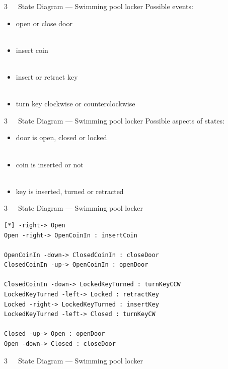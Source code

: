 \documentclass{beamer}
\begin{document}
\begin{frame}{3~~~State Diagram — Swimming pool locker}
Possible \alert{events}:
\\\mbox{}
\begin{itemize}
\item open or close door
\\\mbox{}\\
\item insert coin
\\\mbox{}\\
\item insert or retract key
\\\mbox{}\\
\item turn key clockwise or counterclockwise
\end{itemize}
\end{frame}

\begin{frame}{3~~~State Diagram — Swimming pool locker}
Possible aspects of \alert{states}:
\\\mbox{}
\begin{itemize}
\item door is open, closed or locked
\\\mbox{}\\
\item coin is inserted or not
\\\mbox{}\\
\item key is inserted, turned or retracted
\end{itemize}
\end{frame}

\begin{frame}[fragile]{3~~~State Diagram — Swimming pool locker}
\begin{verbatim}
[*] -right-> Open
Open -right-> OpenCoinIn : insertCoin

OpenCoinIn -down-> ClosedCoinIn : closeDoor
ClosedCoinIn -up-> OpenCoinIn : openDoor

ClosedCoinIn -down-> LockedKeyTurned : turnKeyCCW
LockedKeyTurned -left-> Locked : retractKey
Locked -right-> LockedKeyTurned : insertKey
LockedKeyTurned -left-> Closed : turnKeyCW

Closed -up-> Open : openDoor
Open -down-> Closed : closeDoor
\end{verbatim}
\end{frame}

\begin{frame}{3~~~State Diagram — Swimming pool locker}
\begin{figure}
\def\centering\svgwidth{\textwidth}
\resizebox{\textwidth}{!}{}
\end{figure}
\end{frame}
\end{document}
